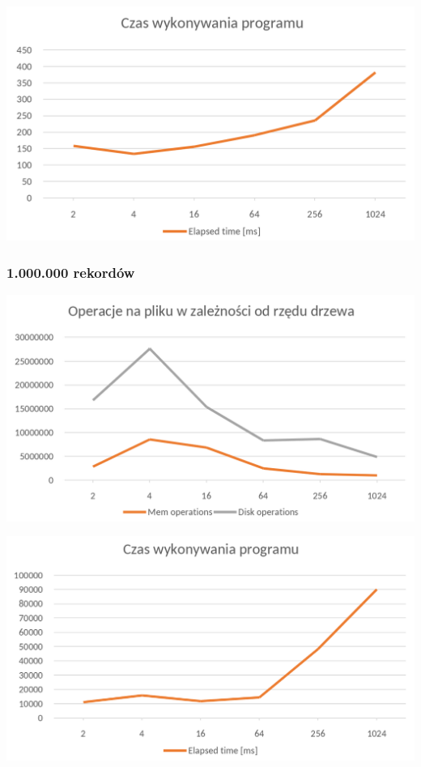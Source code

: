 \documentclass[11pt,a4paper]{article}
\begin{document}
\includegraphics[scale=0.3]{sbd_time_10k.png} 


\subsubsection*{1.000.000 rekordów}

\includegraphics[scale=0.3]{sbd_operations_1m.png} 

\includegraphics[scale=0.3]{sbd_time_1m.png} 
\end{document}

